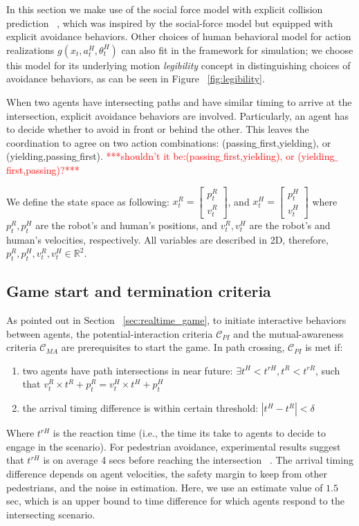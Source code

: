 \documentclass[letterpaper, 10 pt, conference]{ieeeconf}  %
\begin{document}
In this section we make use of the social force model with explicit collision prediction ~\cite{zanlungo2011social}, which was inspired by the social-force model but equipped with explicit avoidance behaviors. Other choices of human behavioral model for action realizations 
$g(x_t,a^H_t,\theta^H_t)$ can also fit in the framework for simulation; we choose this model for its underlying motion \textit{legibility} concept in distinguishing choices of avoidance behaviors, as can be seen in Figure ~\ref{fig:legibility}.  

When two agents have intersecting paths and have similar timing to arrive at the intersection, explicit avoidance behaviors are involved. Particularly, an agent has to decide whether to avoid in front or behind the other. This leaves the coordination to agree on two action combinations: (passing$\_$first,yielding), or (yielding,passing$\_$first). \textcolor{red}{***shouldn't it be:(passing$\_$first,yielding), or (yielding$\_$first,passing)?***}

We define the state space as following: $x_t^R = \begin{bmatrix}
p^R_t\\
v^R_t
\end{bmatrix}$, and $x_t^H = \begin{bmatrix}
p^H_t\\
v^H_t
\end{bmatrix}$
where $p^R_t, p^H_t$ are the robot's and human's positions, and $v^R_t,v^H_t$ are the robot's and human's velocities, respectively. All variables are described in 2D, therefore, $p^R_t,p^H_t,v^R_t,v^H_t \in \mathbb{R}^2$. 

\subsection{Game start and termination criteria}
As pointed out in Section ~\ref{sec:realtime_game}, to initiate interactive 
behaviors between agents, the potential-interaction criteria $\mathcal{C}_{PI}$ 
and the mutual-awareness criteria $\mathcal{C}_{MA}$ are prerequisites to start the 
game. In path crossing, $\mathcal{C}_{PI}$ is met if:
\begin{enumerate}
  \item two agents have path intersections in near future: 
    $\exists t^H<t^{rH}, t^R<t^{rR}$, such that $v^R_t \times t^R + p^R_t = v^H_t \times t^H +p^H_t$
  \item the arrival timing difference is within certain threshold: $|t^H-t^R|<\delta$
\end{enumerate}
Where $t^{rH}$ is the reaction time (i.e., the time its take to agents to decide to 
engage in the scenario). For pedestrian avoidance, experimental results suggest 
that $t^{rH}$ is on average 4 secs before reaching the intersection ~\cite{pettre2009experiment}. The arrival timing difference depends on agent velocities, the safety margin to keep from other pedestrians, and the noise in estimation. Here, we use an estimate value of $1.5$ sec, which is an upper bound to time difference for which agents respond to the intersecting scenario.
\end{document}
